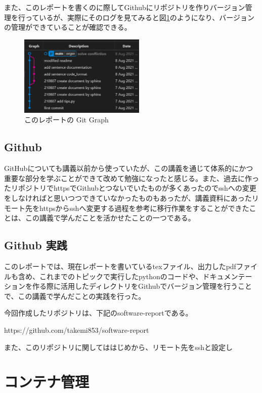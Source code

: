 \documentclass[12pt]{jsarticle}
\begin{document}
また、このレポートを書くのに際してGithubにリポジトリを作りバージョン管理を行っているが、実際にそのログを見てみると図\ref{fig:gitlog}のようになり、バージョンの管理ができていることが確認できる。

\begin{figure}[htbp]
  \begin{center}
    \includegraphics[width=6.0cm]{./vscode_git.png}
    \caption{このレポートの Git Graph}
    \label{fig:gitlog}
  \end{center}
\end{figure}

\subsection{Github}
GitHubについても講義以前から使っていたが、この講義を通じて体系的にかつ重要な部分を学ぶことができて改めて勉強になったと感じる。また、過去に作ったリポジトリでhttpsでGithubとつないでいたものが多くあったのでsshへの変更をしなければと思いつつできていなかったものもあったが、講義資料にあったリモート先をhttpsからsshへ変更する過程を参考に移行作業をすることができたことは、この講義で学んだことを活かせたことの一つである。

\subsection{Github 実践}
このレポートでは、現在レポートを書いているtexファイル、出力したpdfファイルも含め、これまでのトピックで実行したpythonのコードや、ドキュメンテーションを作る際に活用したディレクトリをGithubでバージョン管理を行うことで、この講義で学んだことの実践を行った。

今回作成したリポジトリは、下記のsoftware-reportである。

https://github.com/takemi853/software-report

また、このリポジトリに関してははじめから、リモート先をsshと設定し



\newpage
\section{コンテナ管理}
\end{document}
